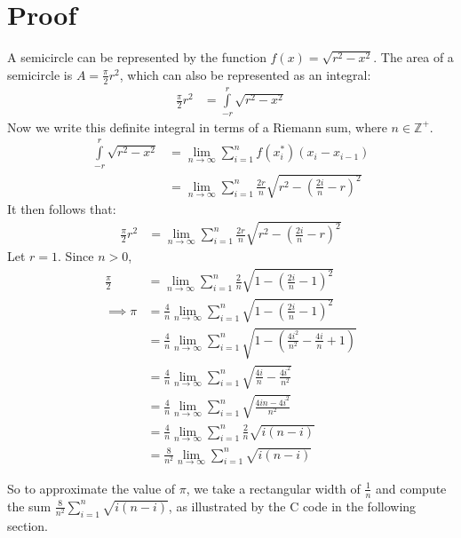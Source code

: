 \documentclass[12pt,a4paper]{article}
\begin{document}
\section {Proof}
A semicircle can be represented by the function $f(x) = \sqrt{r^2-x^2}$. The area of a semicircle is $A = \frac{\pi}{2} r^2$, which can also be represented as an integral:
\begin{align*}
\frac{\pi}{2}r^2 &= \int\limits_{-r}^r \sqrt{r^2-x^2}
\end{align*}
Now we write this definite integral in terms of a Riemann sum, where $n \in \mathbb{Z}^+$.
\begin{align*}
\int\limits_{-r}^r \sqrt{r^2-x^2} &= \lim\limits_{n \to \infty} \sum\limits_{i=1}^n  f(x_i^*) (x_i - x_{i-1})\\
&= \lim\limits_{n \to \infty} \sum\limits_{i=1}^n \frac{2r}{n} \sqrt{r^2 - \left(\frac{2i}{n} -r\right)^2}
\end{align*}
It then follows that:
\begin{align*}
\frac{\pi}{2}r^2 &= \lim\limits_{n \to \infty} \sum\limits_{i=1}^n \frac{2r}{n} \sqrt{r^2 - \left(\frac{2i}{n} -r\right)^2}
\end{align*}
Let $r = 1$. Since $n > 0$,
\begin{align*}
\frac{\pi}{2} &= \lim\limits_{n \to \infty} \sum\limits_{i=1}^n \frac{2}{n} \sqrt{1 - \left(\frac{2i}{n} -1\right)^2}\\
\implies \pi &= \frac{4}{n} \lim\limits_{n \to \infty} \sum\limits_{i=1}^n \sqrt{1 - \left(\frac{2i}{n} -1\right)^2}\\
&= \frac{4}{n} \lim\limits_{n \to \infty} \sum\limits_{i=1}^n \sqrt{1-\left( \frac{4i^2}{n^2} - \frac{4i}{n} + 1 \right)}\\
&= \frac{4}{n} \lim\limits_{n \to \infty} \sum\limits_{i=1}^n \sqrt{\frac{4i}{n} - \frac{4i^2}{n^2}}\\
&= \frac{4}{n} \lim\limits_{n \to \infty} \sum\limits_{i=1}^n \sqrt{\frac{4in - 4i^2}{n^2}}\\
&= \frac{4}{n} \lim\limits_{n \to \infty} \sum\limits_{i=1}^n \frac{2}{n} \sqrt{i(n-i)}\\
&= \frac{8}{n^2} \lim\limits_{n \to \infty} \sum\limits_{i=1}^n \sqrt{i(n-i)}
\end{align*}

So to approximate the value of $\pi$, we take a rectangular width of $\frac{1}{n}$ and compute the sum $\frac{8}{n^2} \sum\limits_{i=1}^n \sqrt{i(n-i)}$, as illustrated by the C code in the following section.
\end{document}
